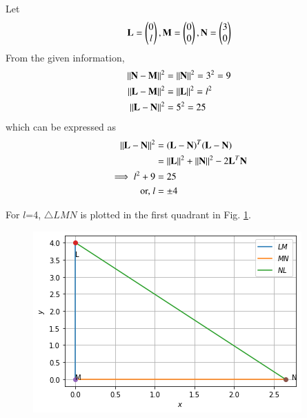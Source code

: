 
Let
\begin{align}
\textbf{L}=\begin{pmatrix}0 \\ l\end{pmatrix},
\textbf{M}=\begin{pmatrix}0 \\ 0\end{pmatrix} ,
\textbf{N}=\begin{pmatrix}3 \\ 0\end{pmatrix}
\end{align}
From the given information, 
\begin{align}
\left\lVert\mathbf{N}-\mathbf{M}\right\rVert^2 &= \left\lVert\mathbf{N}\right\rVert^2  = 3^2 =9
\\
\left\lVert\mathbf{L}-\mathbf{M}\right\rVert^2 &= \left\lVert\mathbf{L}\right\rVert^2 =l^2
\\
\left\lVert\mathbf{L}-\mathbf{N}\right\rVert^2 &=5^2=25
\end{align}
which can  be expressed as
\begin{align}
\left\lVert\mathbf{L}-\mathbf{N}\right\rVert^2 &= ({\mathbf{L}-\mathbf{N}})^T({\mathbf{L}-\mathbf{N}})
\\
&= \left\lVert\mathbf{L}\right\rVert^2 + \left\lVert\mathbf{N}\right\rVert^2 - 2\mathbf{L}^T\mathbf{N}
\\
\implies l^2+9 &= 25
\\
\text{or, } l &= \pm 4
\end{align}

For  $l$=4, $\triangle LMN$  is plotted in the first quadrant in  Fig. \ref{constr/23/fig:Right Angle}.

\begin{figure}[ht]
    \centering
    \includegraphics[width=\columnwidth]{solutions/23/RIGHT_TRIANGLE.png}
    \caption{}
    \label{constr/23/fig:Right Angle}
\end{figure}
























